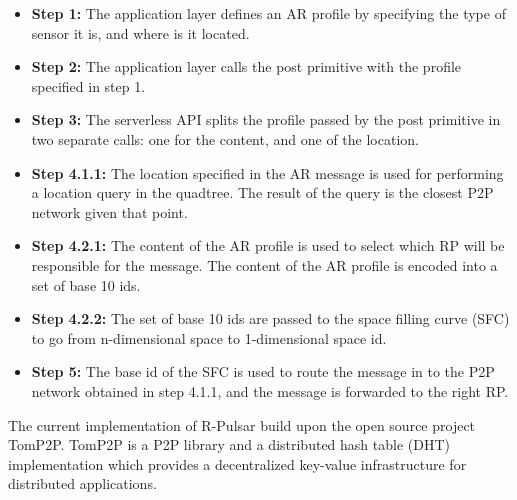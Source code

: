 \begin{itemize}
    \item \textbf{Step 1:} The application layer defines an AR profile by specifying the type of sensor it is, and where is it located.
    
    \item \textbf{Step 2:} The application layer calls the post primitive with the profile specified in step 1.
    
    \item \textbf{Step 3:} The serverless API splits the profile passed by the post primitive in two separate calls: one for the content, and one of the location.
    
    \item \textbf{Step 4.1.1:} The location specified in the AR message is used for performing a location query in the quadtree. The result of the query is the closest P2P network given that point.
    
    \item \textbf{Step 4.2.1:} The content of the AR profile is used to select which RP will be responsible for the message. The content of the AR profile is encoded into a set of base 10 ids.
    
    \item \textbf{Step 4.2.2:} The set of base 10 ids are passed to the space filling curve (SFC) to go from n-dimensional space to 1-dimensional space id.
    
    \item \textbf{Step 5:} The base id of the SFC is used to route the message in to the P2P network obtained in step 4.1.1, and the message is forwarded to the right RP.
\end{itemize}


The current implementation of R-Pulsar build upon the open source project TomP2P. TomP2P is a P2P library and a distributed hash table (DHT) implementation which provides a decentralized key-value infrastructure for distributed applications.


